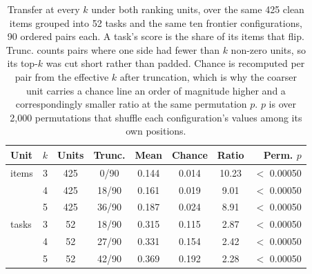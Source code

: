 \begin{table}[t]
\centering
\footnotesize
\begin{tabular}{l S[table-format=1.0] S[table-format=3.0] c S[table-format=1.3] S[table-format=1.3] S[table-format=2.2] r}
\toprule
Unit & {$k$} & {Units} & Trunc. & {Mean} & {Chance} & {Ratio} & Perm. $p$ \\
\midrule
items & 3 & 425 & 0/90 & 0.144 & 0.014 & 10.23 & $<$ 0.00050 \\
 & 4 & 425 & 18/90 & 0.161 & 0.019 & 9.01 & $<$ 0.00050 \\
 & 5 & 425 & 36/90 & 0.187 & 0.024 & 8.91 & $<$ 0.00050 \\
\midrule
tasks & 3 & 52 & 18/90 & 0.315 & 0.115 & 2.87 & $<$ 0.00050 \\
 & 4 & 52 & 27/90 & 0.331 & 0.154 & 2.42 & $<$ 0.00050 \\
 & 5 & 52 & 42/90 & 0.369 & 0.192 & 2.28 & $<$ 0.00050 \\
\bottomrule
\end{tabular}
\caption{Transfer at every $k$ under both ranking units, over the same 425 clean items grouped into 52 tasks and the same ten frontier configurations, 90 ordered pairs each. A task's score is the share of its items that flip. Trunc. counts pairs where one side had fewer than $k$ non-zero units, so its top-$k$ was cut short rather than padded. Chance is recomputed per pair from the effective $k$ after truncation, which is why the coarser unit carries a chance line an order of magnitude higher and a correspondingly smaller ratio at the same permutation $p$. $p$ is over 2{,}000 permutations that shuffle each configuration's values among its own positions.}
\label{tab:tasklevel}
\end{table}
